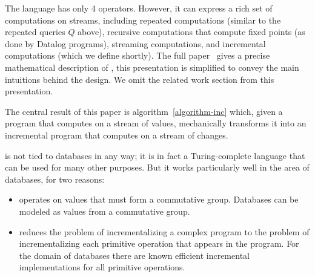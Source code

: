 The \dbsp language has only 4 operators.  However, it can express a
rich set of computations on streams, including repeated computations
(similar to the repeated queries $Q$ above), recursive computations
that compute fixed points (as done by Datalog programs), streaming
computations, and incremental computations (which we define shortly).
The full paper~\cite{budiu-vldb23} gives a precise mathematical
description of \dbsp, this presentation is simplified to convey the
main intuitions behind the design.  We omit the related work section
from this presentation.

The central result of this paper is algorithm~\ref{algorithm-inc}
which, given a \dbsp program that computes on a stream of values,
mechanically transforms it into an incremental \dbsp program that
computes on a stream of changes.

\dbsp is not tied to databases in any way; it is in fact a
Turing-complete language that can be used for many other purposes.
But it works particularly well in the area of databases, for two
reasons:

\begin{itemize}
  \item \dbsp operates on values that must form a commutative group.
    Databases can be modeled as values from a commutative group.
  \item \dbsp reduces the problem of incrementalizing a complex
    program to the problem of incrementalizing each primitive
    operation that appears in the program.  For the domain of
    databases there are known efficient incremental implementations
    for all primitive operations.
\end{itemize}

%

